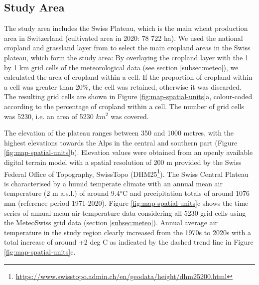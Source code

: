\subsection{Study Area}
\label{data:study-area}
The study area includes the Swiss Plateau, which is the main wheat production area in Switzerland (cultivated area in 2020: 78 722 ha). We used the national cropland and grassland layer from \cite{pazur_national_2022} to select the main cropland areas in the Swiss plateau, which form the study area: By overlaying the cropland layer with the 1 by 1 km grid cells of the meteorological data (see section \ref{subsec:meteo}), we calculated the area of cropland within a cell. If the proportion of cropland within a cell was greater than 20\%, the cell was retained, otherwise it was discarded. The resulting grid cells are shown in Figure \ref{fig:map-spatial-units}a, colour-coded according to the percentage of cropland within a cell. The number of grid cells was 5230, i.e. an area of 5230 $km^2$ was covered.

The elevation of the plateau ranges between 350 and 1000 metres, with the highest elevations towards the Alps in the central and southern part (Figure \ref{fig:map-spatial-units}b). Elevation values were obtained from an openly available digital terrain model with a spatial resolution of 200 m provided by the Swiss Federal Office of Topography, SwissTopo (DHM25\footnote{\url{https://www.swisstopo.admin.ch/en/geodata/height/dhm25200.html}}). The Swiss Central Plateau is characterised by a humid temperate climate with an annual mean air temperature (2 m a.s.l.) of around 9.4°C and precipitation totals of around 1076 mm (reference period 1971-2020). Figure \ref{fig:map-spatial-units}c shows the time series of annual mean air temperature data considering all 5230 grid cells using the MeteoSwiss grid data (section \ref{subsec:meteo}). Annual average air temperature in the study region clearly increased from the 1970s to 2020s with a total increase of around +2 deg C as indicated by the dashed trend line in Figure \ref{fig:map-spatial-units}c.

